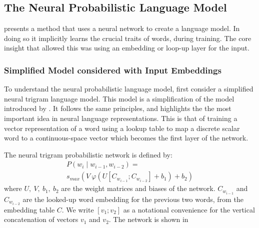 \documentclass[parskip]{komatufte}
\begin{document}
\subsection{The Neural Probabilistic Language Model}\label{sec:the-neural-probabilistic-language-model}

 presents a method that uses a neural network to create a language model.
In doing so it implicitly learns the crucial traits of words, during training.
The core insight that allowed this was using an embedding or loop-up layer for the input.


\subsubsection{Simplified Model considered with Input Embeddings}
To understand the neural probabilistic language model, first consider a simplified neural trigram language model.
This model is a simplification of the model introduced by \textcite{NPLM}.
It follows the same principles, and highlights the the most important idea in neural language representations.
This is that of training a vector representation of a word using a lookup table to map a discrete scalar word to a continuous-space vector which  becomes the first layer of the network.




The  neural trigram probabilistic network is defined by:
%
\begin{multline}
P(w_i \mid w_{i-1}, w_{i-2}) = \\
s_{max}\left(V \: \varphi\left(U\left[C_{w_{i-1}}; C_{w_{i-2}}\right] + b_1\right)+b_2\right)
\end{multline}
%
where $U,\: V,\: b_1,\: b_2$ are the weight matrices and biases of the network.
$C_{w_{i-1}}$ and $C_{w_{i-2}}$ are the looked-up word embedding for the previous two words, from the embedding table $C$.
We write $\left[v_1; v_2\right]$ as a notational convenience for the vertical concatenation of vectors $v_1$ and $v_2$.
The network is shown in 
\end{document}
